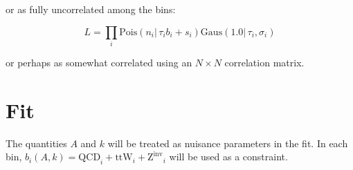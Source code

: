 \documentclass[12pt]{article}
\begin{document}
or as fully uncorrelated among the bins:

\begin{equation}
L=\prod_i \mathrm{Pois}(n_i |\, \tau_i b_i + s_i)\mathrm{Gaus}(1.0 |\,\tau_i, \sigma_i)
\end{equation}

or perhaps as somewhat correlated using an $N \times N$ correlation matrix.





\section{Fit}
The quantities $A$ and $k$ will be treated as nuisance parameters in the fit.  In each bin,
$b_i(A,k) = \mathrm{QCD}_i + \mathrm{ttW}_i + \mathrm{Z^{inv}}_i$ will be used as a constraint.
\end{document}
